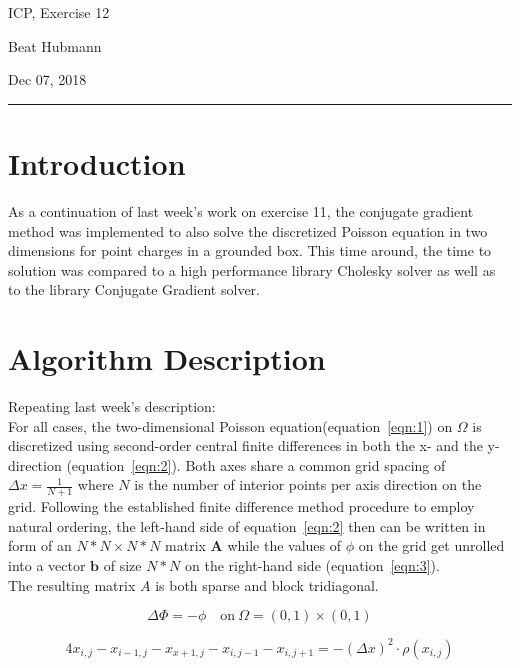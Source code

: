 \documentclass[11pt,a4paper]{article}
\renewcommand{\vec}[1]{\mathbf{#1}}
\begin{document}
\noindent\parbox{\linewidth}{
 \parbox{.25\linewidth}{ \large ICP, Exercise 12 }\hfill
 \parbox{.5\linewidth}{\begin{center} \large Beat Hubmann \end{center}}\hfill
 \parbox{.2\linewidth}{\begin{flushright} \large Dec 07, 2018 \end{flushright}}
}
\noindent\rule{\linewidth}{2pt}


\section{Introduction}

As a continuation of last week's work on exercise 11, the conjugate gradient method was 
implemented to also solve
the discretized Poisson equation in two dimensions for point charges in a grounded box.
This time around, the time to solution was compared to a high performance library Cholesky solver as well 
as to the library Conjugate Gradient solver.

\section{Algorithm Description}

Repeating last week's description:\\
For all cases, the two-dimensional Poisson equation(equation~\ref{eqn:1}) on $\Omega$ is 
discretized using second-order central finite differences in both the x- and the y-direction (equation~\ref{eqn:2}).
Both axes share a common grid spacing of $\Delta x= \frac{1}{N+1}$ where $N$ is the number of interior points
per axis direction on the grid.
Following the established finite difference method procedure to employ natural ordering, the left-hand side of equation~\ref{eqn:2} then can be written
in form of an $N*N \times N*N$ matrix $\vec{A}$ while the values of $\phi$ on the grid get unrolled into a vector $\vec{b}$ of size $N*N$ on the right-hand side (equation~\ref{eqn:3}).\\
The resulting matrix $A$ is both sparse and block tridiagonal.



\begin{equation}
\Delta \Phi = -\phi \quad \text{on}\ \Omega = (0, 1) \times (0,1)
\label{eqn:1}
\end{equation}


\begin{equation}
4x_{i,j} - x_{i-1, j} - x_{x+1, j} - x_{i, j-1} - x_{i, j+1} = -(\Delta x)^2 \cdot \rho(x_{i,j})
\label{eqn:2}
\end{equation}
\end{document}
